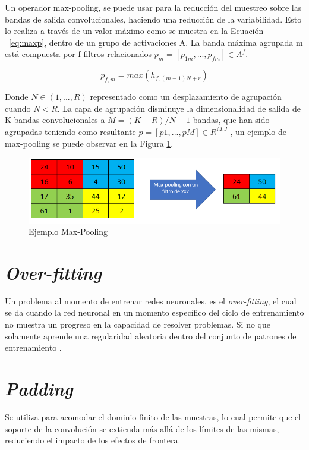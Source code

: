Un operador max-pooling, se puede usar para la reducción del muestreo sobre las bandas de salida convolucionales, haciendo una reducción de la variabilidad. Esto lo realiza a través de un valor máximo como se muestra en la Ecuación ~\ref{eq:maxp}, dentro de un grupo de activaciones A. La banda máxima agrupada m está compuesta por f filtros relacionados $p_{m}=[p_{1m},...,p_{fm}] \in A^f$.

\begin{equation}
	\label{eq:maxp}
	p_{f,m}=max(h_{f,(m-1)N+r})
\end{equation}

Donde $N \in (1,...,R) $ representado como un desplazamiento de agrupación cuando $N < R$. La capa de agrupación disminuye la dimensionalidad de salida de K bandas convolucionales a $M=(K-R)/N+1$ bandas, que han sido agrupadas teniendo como resultante $p=[p1,...,pM] \in R^{M.J}$ \cite{gholamalinezhad2020pooling}, un ejemplo de max-pooling se puede observar en la Figura \ref{mp}.

\begin{figure}[ht]
	\centering
	\includegraphics[scale=0.6]{Figs/mp.png}
	\caption{Ejemplo Max-Pooling}
	\label{mp}
\end{figure}

\section{\textit{Over-fitting}}

Un problema al momento de entrenar redes neuronales, es el \textit{over-fitting}, el cual se da cuando la red neuronal en un momento específico del ciclo de entrenamiento no muestra un progreso en la capacidad de resolver problemas. Si no que solamente aprende una regularidad aleatoria dentro del conjunto de patrones de entrenamiento \cite{jabbar2015methods}.

\section{\textit{Padding}}

Se utiliza para acomodar el dominio finito de las muestras, lo cual permite que el soporte de la convolución se extienda más allá de los límites de las mismas, reduciendo el impacto de los efectos de frontera.\\

